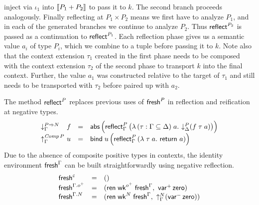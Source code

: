 \documentclass[sigplan,screen]{acmart}
\begin{document}
inject via $\iota_1$ into $\mathopen{{[\kern-0.14em[}} P_1 + P_2 \mathclose{{]\kern-0.14em]}}$ to pass it to $k$.  The
second branch proceeds analogously.
Finally reflecting at $P_1 \times P_2$ means we first have to analyze
$P_1$, and in each of the generated branches we continue to analyze
$P_2$.  Thus $\mathsf{reflect}_{}^{P_2}$ is passed as a continuation to
$\mathsf{reflect}_{}^{P_1}$.  Each reflection phase gives us a semantic value
$a_i$ of type $P_i$, which we combine to a tuple before passing it to
$k$.  Note also that the context extension $\tau_1$ created in the
first phase needs to be composed with the context extension $\tau_2$
of the second phase to transport $k$ into the final context.  Further,
the value $a_1$ was constructed relative to the target of
$\tau_1$ and still needs
to be transported with $\tau_2$ before paired up with $a_2$.

The method $\mathsf{reflect}_{}^{P}$ replaces previous uses of $\mathsf{fresh}^P$ in
reflection and reification at negative types.
\[
\begin{array}{l@{~}lcl}
  \downG {P \To N} & f & = & \tabs
    \left(
      \reflect[\Gamma] P
        \left(
          \lambda \, (\tau : \Gamma \sublist \Delta) \; a .\
          \down[\Delta] P (f \; \tau \; a)
        \right)
    \right)
  \\
  \upG {\Comp P} & u & = & \tbind \; u
    \left(
      \reflect[\Gamma] P
        \left(
          \lambda \; \tau \; a .\
          \treturn\; a
        \right)
    \right)
\end{array}
\]
Due to the absence of composite positive types in contexts,
the identity environment $\mathsf{fresh}^{\Gamma}$ can be built
straightforwardly using negative reflection.
\[
\begin{array}{lcl}
  \mathsf{fresh}^{\varepsilon} & = & () \\
  \mathsf{fresh}^{\Gamma.o^+} & = &
    (
      \mathsf{ren}\;\mathsf{wk}^{o^+}\;\mathsf{fresh}^{\Gamma}
      , \
      \mathsf{var}^{+}\,\mathsf{zero}
    ) \\
  \mathsf{fresh}^{\Gamma.N} & = &
    (
      \mathsf{ren}\;\mathsf{wk}^N\;\mathsf{fresh}^{\Gamma}
      , \
      \mathord{\uparrow_{\Gamma}^{N}} (\mathsf{var}^{-}\,\mathsf{zero})
    ) \\
\end{array}
\]
\end{document}

